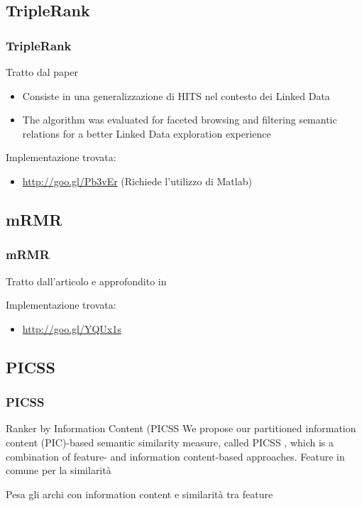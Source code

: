 \documentclass{beamer}
\begin{document}
\subsection{TripleRank}
\begin{frame}
	\frametitle{TripleRank}
	Tratto dal paper \cite{Franz:2009:TRS:1693684.1693699}
	\begin{itemize}
		\item Consiste in una generalizzazione di HITS nel contesto dei Linked Data
		\item The algorithm was evaluated for faceted browsing and filtering semantic relations for a better Linked Data exploration experience
	\end{itemize}
	Implementazione trovata:
	\begin{itemize}
		\item \url{http://goo.gl/Pb3vEr} (Richiede l'utilizzo di Matlab)
	\end{itemize}
\end{frame}
\subsection{mRMR}
\begin{frame}
	\frametitle{mRMR}
	Tratto dall'articolo \cite{Peng05featureselection} e approfondito in \cite{SRutigliano2014}
		Implementazione trovata:
		\begin{itemize}
			\item \url{http://goo.gl/YQUx1s}
		\end{itemize}
\end{frame}


\subsection{PICSS}
\begin{frame}
	\frametitle{PICSS}
	Ranker by Information Content (PICSS We propose our partitioned information 
	content (PIC)-based semantic similarity measure, called PICSS , which is a 
	combination of feature- and information content-based approaches. Feature in
	comune per la similarità
	
	 Pesa gli archi con information content e similarità tra feature
\end{frame}
\end{document}
